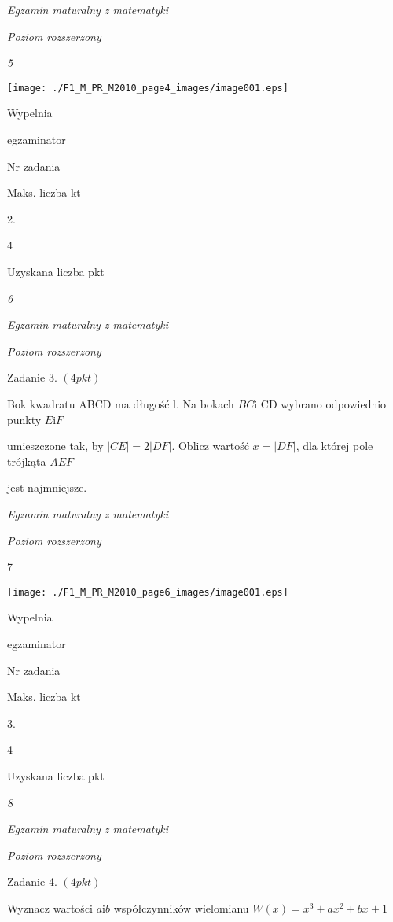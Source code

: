 \documentclass[a4paper,12pt]{article}
\begin{document}
{\it Egzamin maturalny z matematyki}

{\it Poziom rozszerzony}

{\it 5}
\begin{center}
\texttt{[image: ./F1\_M\_PR\_M2010\_page4\_images/image001.eps]}
\end{center}
Wypelnia

egzaminator

Nr zadania

Maks. liczba kt

2.

4

Uzyskana liczba pkt





{\it 6}

{\it Egzamin maturalny z matematyki}

{\it Poziom rozszerzony}

Zadanie 3. $(4pkt)$

Bok kwadratu ABCD ma długość l. Na bokach $BC\mathrm{i}$ CD wybrano odpowiednio punkty $E\mathrm{i}F$

umieszczone tak, by $|CE|=2|DF|$. Oblicz wartość $x=|DF|$, dla której pole trójkąta $AEF$

jest najmniejsze.





{\it Egzamin maturalny z matematyki}

{\it Poziom rozszerzony}

7
\begin{center}
\texttt{[image: ./F1\_M\_PR\_M2010\_page6\_images/image001.eps]}
\end{center}
Wypelnia

egzaminator

Nr zadania

Maks. liczba kt

3.

4

Uzyskana liczba pkt





{\it 8}

{\it Egzamin maturalny z matematyki}

{\it Poziom rozszerzony}

Zadanie 4. $(4pkt)$

Wyznacz wartości $a\mathrm{i}b$ współczynników wielomianu $W(x)=x^{3}+ax^{2}+bx+1$
\end{document}
